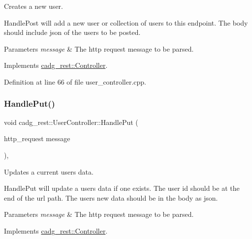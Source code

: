 Creates a new user. 

Handle\+Post will add a new user or collection of users to this endpoint. The body should include json of the users to be posted.


\begin{DoxyParams}{Parameters}
{\em message} & The http request message to be parsed. \\
\hline
\end{DoxyParams}


Implements \mbox{\hyperlink{classcadg__rest_1_1_controller_ae30a2dd46e5054409b98df686327a9c4}{cadg\+\_\+rest\+::\+Controller}}.



Definition at line 66 of file user\+\_\+controller.\+cpp.

\mbox{\label{classcadg__rest_1_1_user_controller_a5da4d0addb0504184929a57d7f196c79}} 
\subsubsection{\texorpdfstring{HandlePut()}{HandlePut()}}
{\footnotesize\ttfamily void cadg\+\_\+rest\+::\+User\+Controller\+::\+Handle\+Put (\begin{DoxyParamCaption}\item[{http\+\_\+request}]{message }\end{DoxyParamCaption})\hspace{0.3cm}{\ttfamily [override]}, {\ttfamily [virtual]}}



Updates a current user\textquotesingle{}s data. 

Handle\+Put will update a user\textquotesingle{}s data if one exists. The user id should be at the end of the url path. The user\textquotesingle{}s new data should be in the body as json.


\begin{DoxyParams}{Parameters}
{\em message} & The http request message to be parsed. \\
\hline
\end{DoxyParams}


Implements \mbox{\hyperlink{classcadg__rest_1_1_controller_a8edfa04d68e8b78759940cd29ff09781}{cadg\+\_\+rest\+::\+Controller}}.



